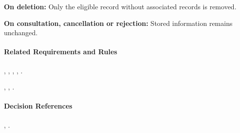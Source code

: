 \textbf{On deletion:}
Only the eligible record without
associated records is removed.

\textbf{On consultation, cancellation or rejection:}
Stored information remains unchanged.

\paragraph{Related Requirements and Rules}
\hyperref[fr:009]{}, \hyperref[fr:010]{}, \hyperref[fr:011]{}, \hyperref[fr:012]{}, \hyperref[fr:013]{}.

\hyperref[br:005]{}, \hyperref[br:006]{}, \hyperref[br:013]{}.

\paragraph{Decision References}
, .
